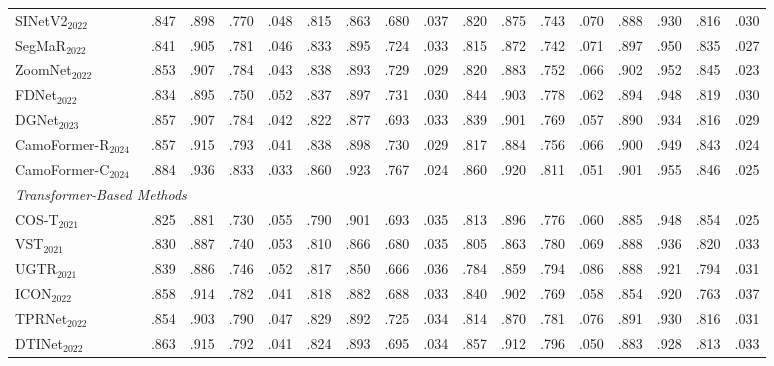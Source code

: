 \documentclass[a4paper,fleqn]{cas-dc}
\begin{document}
\begin{table}[t]
{\begin{tabular}{l|cccc|cccc|cccc|cccc}
			SINetV2$_{2022}$~\citep{fan2021sinetv2} & .847 & .898 & .770 & .048 & .815 & .863 & .680 & .037 & .820 & .875 & .743 & .070 & .888 & .930 & .816 & .030 \\
			SegMaR$_{2022}$~\citep{jia2022segment} & .841 & .905 & .781 & .046 & .833 & .895 & .724 & .033 & .815 & .872 & .742 & .071 & .897 & .950 & .835 & .027 \\
			ZoomNet$_{2022}$~\citep{pang2022zoomnet} & .853 & .907 & .784 & .043 & .838 & .893 & .729 & .029 & .820 & .883 & .752 & .066 & .902 & .952 & .845 & .023 \\
			FDNet$_{2022}$~\citep{zhong2022detecting} & .834 & .895 & .750 & .052 & .837 & .897 & .731 & .030 & .844 & .903 & .778 & .062 & .894 & .948 & .819 & .030 \\
            DGNet$_{2023}$~\citep{ji2023deep} & .857 & .907 & .784 & .042 & .822 & .877 & .693 & .033 & .839 & .901 & .769 & .057 & .890 & .934 & .816 & .029 \\
			CamoFormer-R$_{2024}$~\citep{yin2024camoformer} & .857 & .915 & .793 & .041 & .838 & .898 & .730 & .029 & .817 & .884 & .756 & .066 & .900 & .949 & .843 & .024 \\
			CamoFormer-C$_{2024}$~\citep{yin2024camoformer} & .884 & .936 & .833 & .033 & .860 & .923 & .767 & .024 & .860 & .920 & .811 & .051 & .901 & .955 & .846 & .025 \\
			\midrule
			\multicolumn{17}{l}{\textit{Transformer-Based Methods}} \\
			\midrule
			COS-T$_{2021}$~\citep{wang2022camouflaged} & .825 & .881 & .730 & .055 & .790 & .901 & .693 & .035 & .813 & .896 & .776 & .060 & .885 & .948 & .854 & .025 \\
			VST$_{2021}$~\citep{liu2021visual} & .830 & .887 & .740 & .053 & .810 & .866 & .680 & .035 & .805 & .863 & .780 & .069 & .888 & .936 & .820 & .033 \\
			UGTR$_{2021}$~\citep{yang2021uncertainty} & .839 & .886 & .746 & .052 & .817 & .850 & .666 & .036 & .784 & .859 & .794 & .086 & .888 & .921 & .794 & .031 \\
			ICON$_{2022}$~\citep{zhu2022ICON} & .858 & .914 & .782 & .041 & .818 & .882 & .688 & .033 & .840 & .902 & .769 & .058 & .854 & .920 & .763 & .037 \\
			TPRNet$_{2022}$~\citep{zhang2023Tprnet} & .854 & .903 & .790 & .047 & .829 & .892 & .725 & .034 & .814 & .870 & .781 & .076 & .891 & .930 & .816 & .031 \\
			DTINet$_{2022}$~\citep{liu2022boosting} & .863 & .915 & .792 & .041 & .824 & .893 & .695 & .034 & .857 & .912 & .796 & .050 & .883 & .928 & .813 & .033 \\

\end{tabular}}
\end{table}
\end{document}
